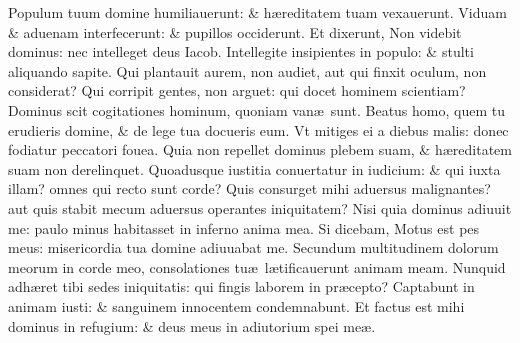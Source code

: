\documentclass[a5paper,10pt]{book}
\def\ae{æ}
\begin{document}
\begin{multicols*}{2}
\newline \color{red} P\color{black}opulum tuum domine humiliauerunt: \& h\ae reditatem tuam vexauerunt.
\newline \color{red} V\color{black}iduam \& aduenam interfecerunt: \& pupillos occiderunt.
\newline \color{red} E\color{black}t dixerunt, Non videbit dominus: nec intelleget deus Iacob.
\newline \color{red} I\color{black}ntellegite insipientes in populo: \& stulti aliquando sapite.
\newline \color{red} Q\color{black}ui plantauit aurem, non audiet, aut qui finxit oculum, non considerat?
\newline \color{red} Q\color{black}ui corripit gentes, non arguet: qui docet hominem scientiam?
\newline \color{red} D\color{black}ominus scit cogitationes hominum, quoniam van\ae \ sunt.
\newline \color{red} B\color{black}eatus homo, quem tu erudieris domine, \& de lege tua docueris eum.
\newline \color{red} V\color{black}t mitiges ei a diebus malis: donec fodiatur peccatori fouea.
\newline \color{red} Q\color{black}uia non repellet dominus plebem suam, \& h\ae reditatem suam non derelinquet.
\newline \color{red} Q\color{black}uoadusque iustitia conuertatur in iudicium: \& qui iuxta illam? omnes qui recto sunt corde?
\newline \color{red} Q\color{black}uis consurget mihi aduersus malignantes? aut quis stabit mecum aduersus operantes iniquitatem?
\newline \color{red} N\color{black}isi quia dominus adiuuit me: paulo minus habitasset in inferno anima mea.
\newline \color{red} S\color{black}i dicebam, Motus est pes meus: misericordia tua domine adiuuabat me.
\newline \color{red} S\color{black}ecundum multitudinem dolorum meorum in corde meo, consolationes tu\ae \ l\ae tificauerunt animam meam.
\newline \color{red} N\color{black}unquid adh\ae ret tibi sedes iniquitatis: qui fingis laborem in pr\ae cepto?
\newline \color{red} C\color{black}aptabunt in animam iusti: \& sanguinem innocentem condemnabunt.
\newline \color{red} E\color{black}t factus est mihi dominus in refugium: \& deus meus in adiutorium spei me\ae .

\end{multicols*}
\end{document}
